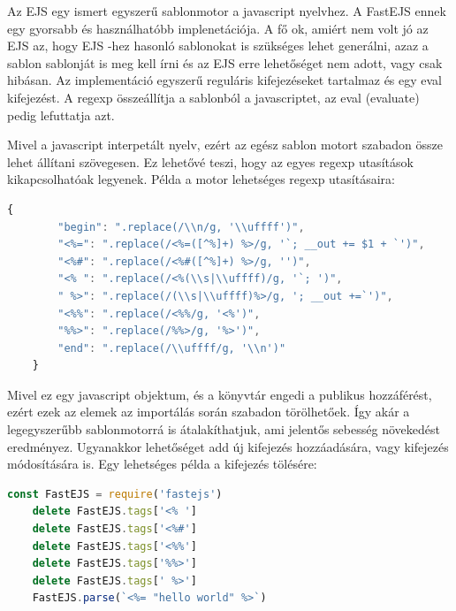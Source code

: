 \documentclass[a4paper,12pt,oneside]{report}
\begin{document}
\begin{justify}

	Az EJS egy ismert egyszerű sablonmotor a javascript nyelvhez. A FastEJS ennek egy gyorsabb és használhatóbb implenetációja. A fő ok, amiért nem volt jó az EJS az, hogy EJS -hez hasonló sablonokat is szükséges lehet generálni, azaz a sablon sablonját is meg kell írni és az EJS erre lehetőséget nem adott, vagy csak hibásan. Az implementáció egyszerű reguláris kifejezéseket tartalmaz és egy eval kifejezést. A regexp összeállítja a sablonból a javascriptet, az eval (evaluate) pedig lefuttatja azt.

	Mivel a javascript interpetált nyelv, ezért az egész sablon motort szabadon össze lehet állítani szövegesen. Ez lehetővé teszi, hogy az egyes regexp utasítások kikapcsolhatóak legyenek. Példa a motor lehetséges regexp utasításaira:

	\begin{lstlisting}[language=javascript]
	{
		"begin": ".replace(/\\n/g, '\\uffff')",
		"<%=": ".replace(/<%=([^%]+) %>/g, '`; __out += $1 + `')",
		"<%#": ".replace(/<%#([^%]+) %>/g, '')",
		"<% ": ".replace(/<%(\\s|\\uffff)/g, '`; ')",
		" %>": ".replace(/(\\s|\\uffff)%>/g, '; __out +=`')",
		"<%%": ".replace(/<%%/g, '<%')",
		"%%>": ".replace(/%%>/g, '%>')",
		"end": ".replace(/\\uffff/g, '\\n')"
	}
	\end{lstlisting}

	Mivel ez egy javascript objektum, és a könyvtár engedi a publikus hozzáférést, ezért ezek az elemek az importálás során szabadon törölhetőek. Így akár a legegyszerűbb sablonmotorrá is átalakíthatjuk, ami jelentős sebesség növekedést eredményez. Ugyanakkor lehetőséget add új kifejezés hozzáadására, vagy kifejezés módosítására is. Egy lehetséges példa a kifejezés tölésére:

	\begin{lstlisting}[language=javascript]
	const FastEJS = require('fastejs')
	delete FastEJS.tags['<% ']
	delete FastEJS.tags['<%#']
	delete FastEJS.tags['<%%']
	delete FastEJS.tags['%%>']
	delete FastEJS.tags[' %>']
	FastEJS.parse(`<%= "hello world" %>`)
	\end{lstlisting}

\end{justify}
\end{document}
